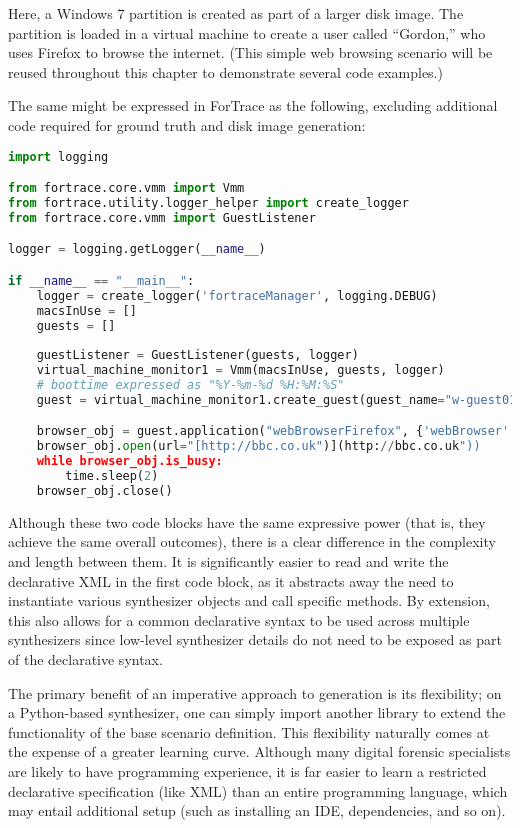 \documentclass[letterpaper,12pt]{report}
\begin{document}
Here, a Windows 7 partition is created as part of a larger disk image.
The partition is loaded in a virtual machine to create a user called
``Gordon,'' who uses Firefox to browse the internet. (This simple web
browsing scenario will be reused throughout this chapter to demonstrate
several code examples.)

The same might be expressed in ForTrace
\cite{gobelForTraceHolisticForensic2022} as the following, excluding
additional code required for ground truth and disk image generation:

\begin{lstlisting}[language=Python]
import logging

from fortrace.core.vmm import Vmm
from fortrace.utility.logger_helper import create_logger
from fortrace.core.vmm import GuestListener

logger = logging.getLogger(__name__)

if __name__ == "__main__":
    logger = create_logger('fortraceManager', logging.DEBUG)
    macsInUse = []
    guests = []
    
    guestListener = GuestListener(guests, logger)
    virtual_machine_monitor1 = Vmm(macsInUse, guests, logger)
    # boottime expressed as "%Y-%m-%d %H:%M:%S"
    guest = virtual_machine_monitor1.create_guest(guest_name="w-guest01", platform="windows", boottime="2013-01-01 13:14:00")

    browser_obj = guest.application("webBrowserFirefox", {'webBrowser': "firefox"})
    browser_obj.open(url="[http://bbc.co.uk")](http://bbc.co.uk"))
    while browser_obj.is_busy:
        time.sleep(2)
    browser_obj.close()
\end{lstlisting}

Although these two code blocks have the same expressive power (that is,
they achieve the same overall outcomes), there is a clear difference in
the complexity and length between them. It is significantly easier to
read and write the declarative XML in the first code block, as it
abstracts away the need to instantiate various synthesizer objects and
call specific methods. By extension, this also allows for a common
declarative syntax to be used across multiple synthesizers since
low-level synthesizer details do not need to be exposed as part of the
declarative syntax.

The primary benefit of an imperative approach to generation is its
flexibility; on a Python-based synthesizer, one can simply import
another library to extend the functionality of the base scenario
definition. This flexibility naturally comes at the expense of a greater
learning curve. Although many digital forensic specialists are likely to
have programming experience, it is far easier to learn a restricted
declarative specification (like XML) than an entire programming
language, which may entail additional setup (such as installing an IDE,
dependencies, and so on).
\end{document}
